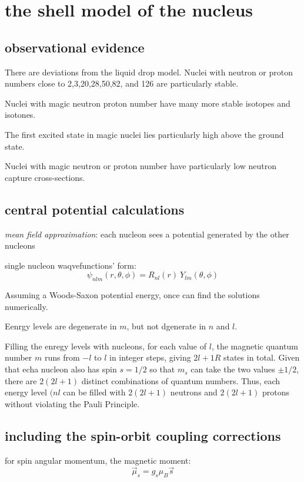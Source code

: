 \documentclass[10pt, a4paper, twocolumn]{article}
\newcommand{\deff}[1]{\par \noindent \textit{#1}: }
\begin{document}
\section{the shell model of the nucleus}
\subsection{observational evidence}
There are deviations from the liquid drop model.
Nuclei with neutron or proton numbers close to 2,3,20,28,50,82, and 126 are particularly stable.

Nuclei with magic neutron proton number have many more stable isotopes and isotones.

The first excited state in magic nuclei lies particularly high above the ground state.

Nuclei with magic neutron or proton number have particularly low neutron capture cross-sections.

\subsection{central potential calculations}

\deff{mean field approximation}
each nucleon sees a potential generated by the other nucleons

single nucleon waqvefunctions' form:
\[\psi _{nlm}(r,\theta,\phi) = R_{nl}(r)
\ Y_{lm}(\theta,\phi)\]

Assuming a Woods-Saxon potential energy, once can find the solutions numerically.

Eenrgy levels are degenerate in $m$, but not dgenerate in $n$ and $l$.

Filling the enregy levels with nucleons, for each value of $l$, the magnetic quantum number $m$ runs from $-l$ to $l$ in integer steps, giving $2l+1R$ states in total.
Given that echa nucleon also has spin $s=1/2$ so that $m_s$ can take the two values $\pm 1/2$, there are $2(2l+1)$ distinct combinations of quantum numbers. Thus, each energy level $(nl$ can be filled with $2(2l+1)$ neutrons and $2(2l+1)$ protons without violating the Pauli Principle.

\subsection{including the spin-orbit coupling corrections}

for spin angular momentum, the magnetic moment:
\[\vec \mu _s = g_s\mu _B\vec s\]
\end{document}
